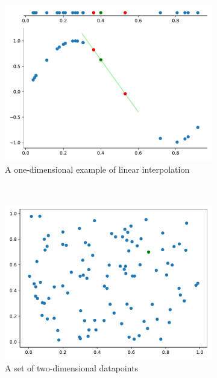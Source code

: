 \begin{figure}[] %
	\centering
	\begin{subfigure}[t]{0.5\textwidth}
		\centering
		\includegraphics[width=\linewidth]{images/vis1d.pdf}
		\caption{A one-dimensional example of linear interpolation}
		\label{fig:one-dim-interpolation}
	\end{subfigure}%
	~ 
	\begin{subfigure}[t]{0.5\textwidth}
		\centering
		\includegraphics[width=\linewidth]{images/vis2d1.pdf}
		\caption{A set of two-dimensional datapoints}
		\label{fig:3dinterpolate-1}
	\end{subfigure}
	\caption{}
	
\end{figure}

